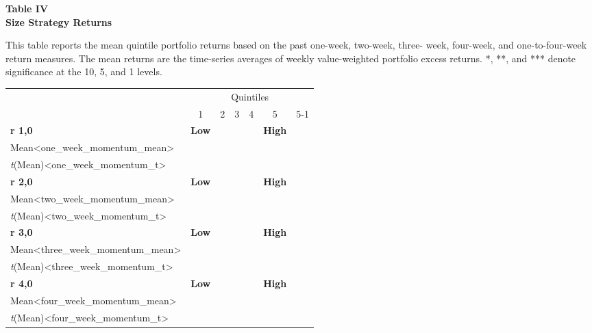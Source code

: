 \documentclass{article}
\begin{document}
    \begin{center}
        \textbf{
        Table IV
        \\
        Size Strategy Returns
        }
        \begin{justify}
            \footnotesize{
                This table reports the mean quintile portfolio returns based on the past one-week, two-week, three- week, four-week, and one-to-four-week return measures. The mean returns are the time-series averages of weekly value-weighted portfolio excess returns. *, **, and *** denote significance at the 10, 5, and 1 levels.
            }
        \end{justify}
        \-
        \begin{tabular}{lcccccr}
            \toprule
            \multicolumn{1}{c}{} & \multicolumn{6}{c}{Quintiles}
            \\
            \cmidrule(lr){2-7}
            & 1 & 2 & 3 & 4 & 5 & 5-1
            \\
            \midrule
            \multicolumn{1}{l}{\textbf{r 1,0}} & \multicolumn{1}{c}{\textbf{Low}} & \multicolumn{3}{c}{} & \multicolumn{1}{c}{\textbf{High}}
            \\
            Mean<one_week_momentum_mean>
            \\
            \textit{t}(Mean)<one_week_momentum_t>
            \\ [0.2cm]
            \multicolumn{1}{l}{\textbf{r 2,0}} & \multicolumn{1}{c}{\textbf{Low}} & \multicolumn{3}{c}{} & \multicolumn{1}{c}{\textbf{High}}
            \\
            Mean<two_week_momentum_mean>
            \\
            \textit{t}(Mean)<two_week_momentum_t>
            \\ [0.2cm]
            \multicolumn{1}{l}{\textbf{r 3,0}} & \multicolumn{1}{c}{\textbf{Low}} & \multicolumn{3}{c}{} & \multicolumn{1}{c}{\textbf{High}}
            \\
            Mean<three_week_momentum_mean>
            \\
            \textit{t}(Mean)<three_week_momentum_t>
            \\ [0.2cm]
            \multicolumn{1}{l}{\textbf{r 4,0}} & \multicolumn{1}{c}{\textbf{Low}} & \multicolumn{3}{c}{} & \multicolumn{1}{c}{\textbf{High}}
            \\
            Mean<four_week_momentum_mean>
            \\
            \textit{t}(Mean)<four_week_momentum_t>

\end{tabular}
\end{center}
\end{document}
